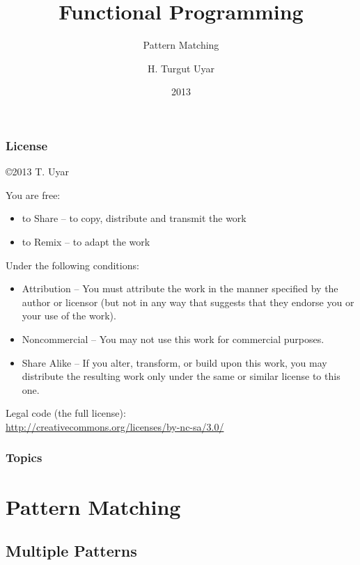 \documentclass[dvipsnames]{beamer}
\title{Functional Programming}
\subtitle{Pattern Matching}
\author{H. Turgut Uyar}
\date{2013}
\theoremstyle{plain}
\begin{document}
\begin{frame}
  \titlepage
\end{frame}

\begin{frame}
  \frametitle{License}

  \hfill
  \copyright 2013 T. Uyar

  \vfill
  \begin{tiny}
    You are free:
    \begin{itemize}
      \item to Share -- to copy, distribute and transmit the work
      \item to Remix -- to adapt the work
    \end{itemize}

    Under the following conditions:
    \begin{itemize}
      \item Attribution -- You must attribute the work in the manner specified by
        the author or licensor (but not in any way that suggests that they
        endorse you or your use of the work).

      \item Noncommercial -- You may not use this work for commercial purposes.

      \item Share Alike -- If you alter, transform, or build upon this work, you
        may distribute the resulting work only under the same or similar license
        to this one.
    \end{itemize}
  \end{tiny}

  \vfill
  Legal code (the full license):\\
  \url{http://creativecommons.org/licenses/by-nc-sa/3.0/}
\end{frame}

\begin{frame}
  \frametitle{Topics}
  \tableofcontents
\end{frame}

\section{Pattern Matching}

\subsection{Multiple Patterns}
\end{document}

